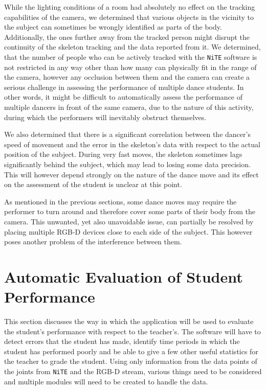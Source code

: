 \documentclass[11pt,a4paper]{article}
\begin{document}
\medskip \noindent While the lighting conditions of a room had absolutely no effect on the tracking capabilities of the camera, we determined that various objects in the vicinity to the subject can sometimes be wrongly identified as parts of the body. Additionally, the ones further away from the tracked person might disrupt the continuity of the skeleton tracking and the data reported from it. We determined, that the number of people who can be actively tracked with the \texttt{NiTE} software is not restricted in any way other than how many can physically fit in the range of the camera, however any occlusion between them and the camera can create a serious challenge in assessing the performance of multiple dance students. In other words, it might be difficult to automatically assess the performance of multiple dancers in front of the same camera, due to the nature of this activity, during which the performers will inevitably obstruct themselves.

\medskip \noindent We also determined that there is a significant correlation between the dancer's speed of movement and the error in the skeleton's data with respect to the actual position of the subject. During very fast moves, the skeleton sometimes lags significantly behind the subject, which may lead to losing some data precision. This will however depend strongly on the nature of the dance move and its effect on the assessment of the student is unclear at this point.

\medskip \noindent As mentioned in the previous sections, some dance moves may require the performer to turn around and therefore cover some parts of their body from the camera. This unwanted, yet also unavoidable issue, can partially be resolved by placing multiple RGB-D devices close to each side of the subject. This however poses another problem of the interference between them. %

\clearpage

\section{Automatic Evaluation of Student Performance}
\noindent
This section discusses the way in which the application will be used to evaluate the student's performance with respect to the teacher's. The software will have to detect errors that the student has made, identify time periods in which the student has performed poorly and be able to give a few other useful statistics for the teacher to grade the student. Using only information from the data points of the joints from \texttt{NiTE} and the RGB-D stream, various things need to be considered and multiple modules will need to be created to handle the data. 
\end{document}
